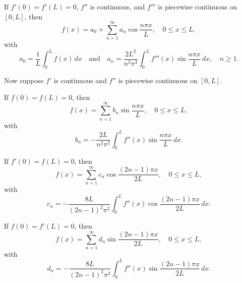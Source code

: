 \begin{theorem}\label{thmtype:11.3.5}\begin{alist}[above=-\baselineskip]
\item
If $f'(0)=f'(L)=0$, $f''$ is continuous, and $f'''$ is piecewise
continuous  on $[0,L]$, then
\begin{equation} \label{eq:11.3.3}
f(x)=a_0+\sum_{n=1}^\infty a_n\cos\frac{n\pi x}{L},
\quad 0\le x\le L,
\end{equation}
with
\begin{equation} \label{eq:11.3.4}
a_0=\frac{1}{L}\int_0^L f(x)\,dx \quad\text{and}\quad
a_n= \frac{2L^2}{n^3\pi^3}\int_0^L f'''(x)\sin\frac{n\pi
x}{L}\,dx,
\quad n\ge1.
\end{equation}

Now suppose $f'$ is continuous and $f''$ is piecewise
continuous on $[0,L]$.

\item
If  $f(0)=f(L)=0$, then
\[
f(x)=\sum_{n=1}^\infty b_n\sin\frac{n\pi x}{L},
\quad 0\le x\le L,
\]
with
\begin{equation} \label{eq:11.3.5}
b_n=-\frac{2L}{n^2\pi^2}\int_0^L f''(x)\sin\frac{n\pi
x}{L}\,dx.
\end{equation}

\item
If  $f'(0)=f(L)=0$, then
\[
f(x)=
\sum_{n=1}^\infty c_n\cos\frac{(2n-1)\pi x}{2L},
\quad 0\le x\le L,
\]
with
\begin{equation} \label{eq:11.3.6}
c_n=-\frac{8L}{(2n-1)^2\pi^2}\int_0^L f''(x)\cos\frac{(2n-1)\pi x}{2L}
\,dx.
\end{equation}

\item
If  $f(0)=f'(L)=0$, then
\[
f(x)=
\sum_{n=1}^\infty d_n\sin\frac{(2n-1)\pi x}{2L},
\quad 0\le x\le L,
\]
with
\begin{equation} \label{eq:11.3.7}
d_n=-\frac{8L}{(2n-1)^2\pi^2}\int_0^L f''(x)\sin\frac{(2n-1)\pi x}{2L}
\,dx.
\end{equation}
\end{alist}
\end{theorem}


